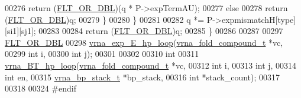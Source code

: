 \begin{DoxyCode}
00276         \textcolor{keywordflow}{return} (\hyperlink{group__data__structures_ga31125aeace516926bf7f251f759b6126}{FLT\_OR\_DBL})(q * P->expTermAU);
00277       \textcolor{keywordflow}{else}
00278         \textcolor{keywordflow}{return} (\hyperlink{group__data__structures_ga31125aeace516926bf7f251f759b6126}{FLT\_OR\_DBL})q;
00279     \}
00280   \}
00281 
00282   q *= P->expmismatchH[type][si1][sj1];
00283 
00284   \textcolor{keywordflow}{return} (\hyperlink{group__data__structures_ga31125aeace516926bf7f251f759b6126}{FLT\_OR\_DBL})q;
00285 \}
00286 
00287 
00297 \hyperlink{group__data__structures_ga31125aeace516926bf7f251f759b6126}{FLT\_OR\_DBL}
00298 \hyperlink{group__loops_gac9f49b31d3ec1d9040798b05506c71da}{vrna\_exp\_E\_hp\_loop}(\hyperlink{group__fold__compound_structvrna__fc__s}{vrna\_fold\_compound\_t} *vc,
00299                    \textcolor{keywordtype}{int}                  i,
00300                    \textcolor{keywordtype}{int}                  j);
00301 
00302 
00310 \textcolor{keywordtype}{int}
00311 \hyperlink{group__loops_ga6c4ba14d24f716d0ca9021771357e903}{vrna\_BT\_hp\_loop}(\hyperlink{group__fold__compound_structvrna__fc__s}{vrna\_fold\_compound\_t}  *vc,
00312                 \textcolor{keywordtype}{int}                   i,
00313                 \textcolor{keywordtype}{int}                   j,
00314                 \textcolor{keywordtype}{int}                   en,
00315                 \hyperlink{group__data__structures_structvrna__bp__stack__s}{vrna\_bp\_stack\_t}       *bp\_stack,
00316                 \textcolor{keywordtype}{int}                   *stack\_count);
00317 
00318 
00324 \textcolor{preprocessor}{#endif}
\end{DoxyCode}
